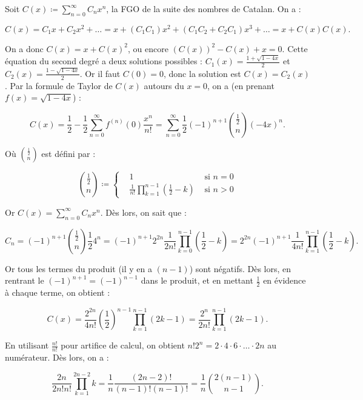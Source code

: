 \documentclass{article}
\begin{document}
			Soit $C(x) \coloneqq \sum_{n=0}^\infty C_n x^n$, la FGO de la suite des nombres de Catalan. On a :

			\[C(x) = C_1x + C_2x^2 + \ldots = x + (C_1C_1)x^2 + (C_1C_2 + C_2C_1)x^3 + \ldots = x + C(x)C(x).\]

			On a donc $C(x) = x + C(x)^2$, ou encore $(C(x))^2 - C(x) + x = 0$. Cette équation du second degré a deux solutions possibles :
			$C_1(x) = \frac {1+\sqrt {1-4x}}2$ et $C_2(x) = \frac {1-\sqrt {1-4x}}2$. Or il faut $C(0) = 0$, donc la solution est $C(x) = C_2(x)$.
			Par la formule de Taylor de $C(x)$ autours du $x=0$, on a (en prenant $f(x) = \sqrt {1-4x}$) :

			\[C(x) = \frac 12 - \frac 12\sum_{n=0}^\infty f^{(n)}(0)\frac {x^n}{n!} = \sum_{n=0}^\infty \frac 12(-1)^{n+1}\binom {\frac 12}n(-4x)^n.\]

			Où $\binom {\frac 12}n$ est défini par :

			\[\binom {\frac 12}n \coloneqq \left\{\begin{aligned}&1 &\text{ si } n=0\\&\frac 1{n!}\prod_{k=1}^{n-1}\left(\frac 12-k\right) &\text{ si } n > 0\end{aligned}\right.\]

			Or $C(x) = \sum_{n=0}^\infty C_nx^n$. Dès lors, on sait que :

			\[C_n = (-1)^{n+1}\binom {\frac 12}n\frac 124^n = (-1)^{n+1} 2^{2n}\frac 1{2n!}\prod_{k=0}^{n-1}\left(\frac 12 - k\right) = 2^{2n}(-1)^{n+1}\frac 1{4n!}\prod_{k=1}^{n-1}\left(\frac 12-k\right).\]

			Or tous les termes du produit (il y en a $(n-1)$) sont négatifs. Dès lors, en rentrant le $(-1)^{n+1} = (-1)^{n-1}$ dans le produit, et en mettant $\frac 12$
			en évidence à chaque terme, on obtient :

			\[C(x) = \frac {2^{2n}}{4n!}\left(\frac 12\right)^{n-1}\prod_{k=1}^{n-1}(2k-1) = \frac {2^n}{2n!}\prod_{k=1}^{n-1}(2k-1).\]

			En utilisant $\frac {n!}{n!}$ pour artifice de calcul, on obtient $n!2^n = 2\cdot4\cdot6\cdot\ldots\cdot2n$ au numérateur. Dès lors, on a :

			\[\frac {2n}{2n!n!}\prod_{k=1}^{2n-2}k = \frac 1{n}\frac {(2n-2)!}{(n-1)!(n-1)!} = \frac 1n\binom {2(n-1)}{n-1}.\]
\end{document}
